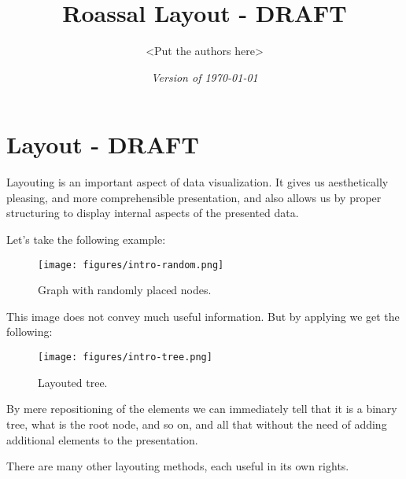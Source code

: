 \documentclass[a4paper,10pt,twoside]{book}
\begin{document}
\frontmatter
\setcounter{page}{1}
\pagestyle{headings}
\author{
  <Put the authors here>
}
\title{\Huge\bf Roassal Layout - DRAFT }
\isodate
\date{\emph{Version of \today}}
\maketitle
\tableofcontents

\sloppy %
\mainmatter

\chapter{ Layout - DRAFT}
Layouting is an important aspect of data visualization. It gives us aesthetically pleasing, and more comprehensible presentation, and also allows us by proper structuring to display internal aspects of the presented data.

Let's take the following example:


\begin{figure}

\begin{center}
\texttt{[image: figures/intro-random.png]}\caption{Graph with randomly placed nodes.\label{intro-random}}\end{center}
\end{figure}


This image does not convey much useful information. But by applying  we get the following:


\begin{figure}

\begin{center}
\texttt{[image: figures/intro-tree.png]}\caption{Layouted tree.\label{intro-tree}}\end{center}
\end{figure}


By mere repositioning of the elements we can immediately tell that it is a binary tree, what is the root node, and so on, and all that without the need of adding additional elements to the presentation.

There are many other layouting methods, each useful in its own rights.
\end{document}
